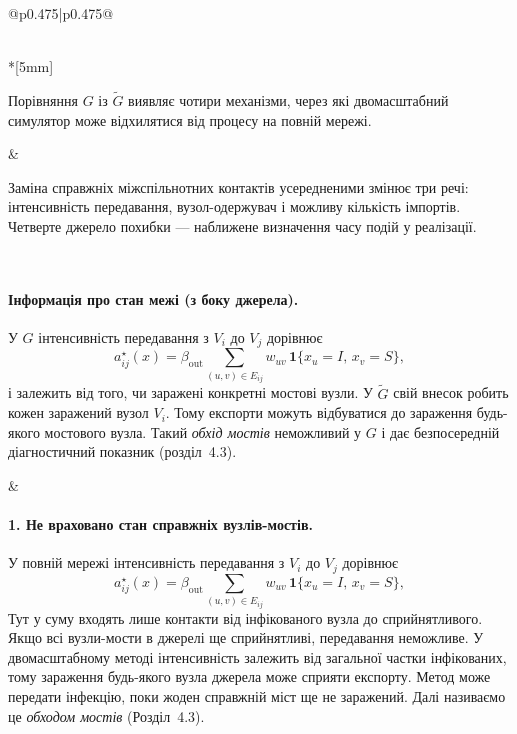 \documentclass[11pt]{article}
\newcommand{\ind}{\mathbf{1}}
\begin{document}
\begin{longtable}{@{}p{0.475\textwidth}|p{0.475\textwidth}@{}}
\begin{minipage}[t]{\linewidth}
\end{minipage} \\*[5mm]
\begin{minipage}[t]{\linewidth}
Порівняння $G$ із $\tilde G$ виявляє чотири механізми, через які двомасштабний симулятор може відхилятися від процесу на повній мережі.
\end{minipage} &
\begin{minipage}[t]{\linewidth}
Заміна справжніх міжспільнотних контактів усередненими змінює три речі: інтенсивність передавання, вузол-одержувач і можливу кількість імпортів. Четверте джерело похибки --- наближене визначення часу подій у реалізації.
\end{minipage} \\[5mm]
\begin{minipage}[t]{\linewidth}
\paragraph{Інформація про стан межі (з боку джерела).}
У $G$ інтенсивність передавання з $V_i$ до $V_j$ дорівнює
\begin{equation*}a^\star_{ij}(x)=\beta_{\mathrm{out}}\sum_{(u,v)\in E_{ij}}w_{uv}\,\ind\{x_u=I,\,x_v=S\},\tag{7}
\end{equation*}
і залежить від того, чи заражені конкретні мостові вузли. У $\tilde G$ свій внесок робить кожен заражений вузол $V_i$. Тому експорти можуть відбуватися до зараження будь-якого мостового вузла. Такий \emph{обхід мостів} неможливий у $G$ і дає безпосередній діагностичний показник (розділ~4.3).
\end{minipage} &
\begin{minipage}[t]{\linewidth}
\paragraph{1. Не враховано стан справжніх вузлів-мостів.}
У повній мережі інтенсивність передавання з $V_i$ до $V_j$ дорівнює
\begin{equation*}a^\star_{ij}(x)=\beta_{\mathrm{out}}\sum_{(u,v)\in E_{ij}}w_{uv}\,\ind\{x_u=I,\,x_v=S\},\tag{7}
\end{equation*}
Тут у суму входять лише контакти від інфікованого вузла до сприйнятливого. Якщо всі вузли-мости в джерелі ще сприйнятливі, передавання неможливе. У двомасштабному методі інтенсивність залежить від загальної частки інфікованих, тому зараження будь-якого вузла джерела може сприяти експорту. Метод може передати інфекцію, поки жоден справжній міст ще не заражений. Далі називаємо це \emph{обходом мостів} (Розділ~4.3).
\end{minipage} \\[5mm]
\begin{minipage}[t]{\linewidth}

\end{minipage}
\end{longtable}
\end{document}
